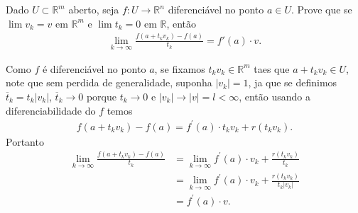 \begin{homeworkProblem}[Seção 1-5]
  Dado $U \subset \mathbb{R}^m$ aberto, seja $f : U \to \mathbb{R}^n$ diferenciável no ponto $a \in U$. Prove que se $\lim v_k = v$ em $\mathbb{R}^m$ e $\lim t_k = 0$ em $\mathbb{R}$, então
  \begin{align*}
    \lim_{k\to\infty} \frac{f(a+t_k v_k)-f(a)}{t_k} = f'(a)\cdot v.   
  \end{align*}
  \begin{solution}
    Como $f$ é diferenciável no ponto $a$, se fixamos $t_kv_k\in\mathbb{R}^{m}$ taes que $a+t_kv_k\in U$, note que sem perdida de generalidade, suponha $|v_k|=1$, ja que se definimos $\overline{t}_k=t_k|v_k|$, $\overline{t}_k\to 0$ porque $t_k\to 0$ e $|v_k|\to|v|=l<\infty$, então usando a diferenciabilidade do $f$ temos 
    \begin{align*}
      f(a+t_kv_k)-f(a)=f^{\prime}(a)\cdot t_kv_k + r(t_kv_k).
    \end{align*}
    Portanto
    \begin{align*}
      \lim_{k \to \infty}\frac{f(a+t_kv_k)-f(a)}{t_k}&=\lim_{k \to \infty}f^{\prime}(a)\cdot v_k+\frac{r(t_kv_k)}{t_k}\\
      &=\lim_{k \to \infty}f^{\prime}(a)\cdot v_k+\frac{r(t_kv_k)}{t_k|v_k|}\\
      &=f^{\prime}(a)\cdot v.
    \end{align*}
  \end{solution}
\end{homeworkProblem}
